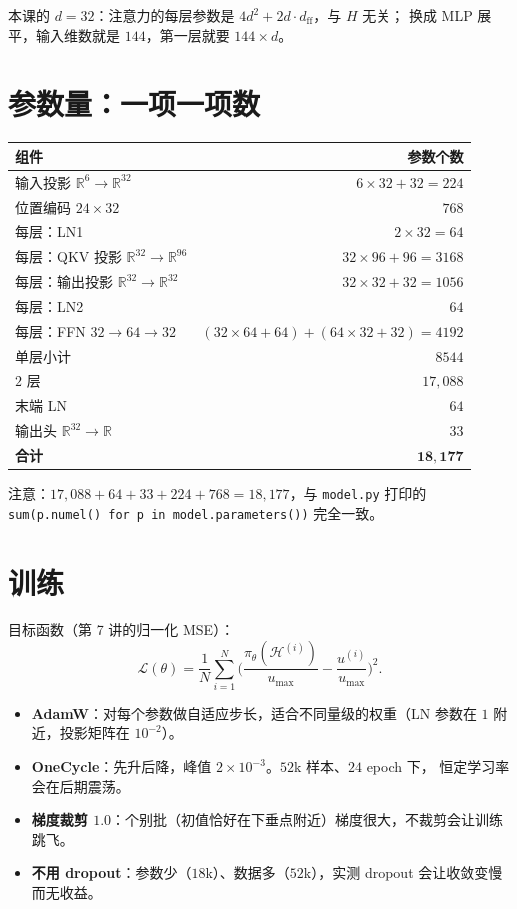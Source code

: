 本课的 $d=32$：注意力的每层参数是 $4d^2+2d\cdot d_{\text{ff}}$，与 $H$ 无关；
换成 MLP 展平，输入维数就是 $144$，第一层就要 $144\times d$。

\section{参数量：一项一项数}

\begin{center}
\small
\begin{tabular}{@{}lr@{}}
\toprule
组件 & 参数个数 \\
\midrule
输入投影 $\mathbb{R}^6\to\mathbb{R}^{32}$ & $6\times32+32=224$ \\
位置编码 $24\times32$ & $768$ \\
每层：LN1 & $2\times32=64$ \\
每层：QKV 投影 $\mathbb{R}^{32}\to\mathbb{R}^{96}$ & $32\times96+96=3168$ \\
每层：输出投影 $\mathbb{R}^{32}\to\mathbb{R}^{32}$ & $32\times32+32=1056$ \\
每层：LN2 & $64$ \\
每层：FFN $32\to64\to32$ & $(32\times64+64)+(64\times32+32)=4192$ \\
\midrule
单层小计 & $8544$ \\
$2$ 层 & $17{,}088$ \\
\midrule
末端 LN & $64$ \\
输出头 $\mathbb{R}^{32}\to\mathbb{R}$ & $33$ \\
\midrule
\textbf{合计} & $\mathbf{18{,}177}$ \\
\bottomrule
\end{tabular}
\end{center}

注意：$17{,}088+64+33+224+768=18{,}177$，与 \texttt{model.py} 打印的
\texttt{sum(p.numel() for p in model.parameters())} 完全一致。

\section{训练}

目标函数（第 7 讲的归一化 MSE）：
\begin{equation}
  \mathcal{L}(\theta)=\frac{1}{N}\sum_{i=1}^{N}
  \Big(\frac{\pi_\theta(\mathcal{H}^{(i)})}{u_{\max}}-\frac{u^{(i)}}{u_{\max}}\Big)^2 .
\end{equation}

\begin{itemize}[leftmargin=2em,itemsep=2pt]
  \item \textbf{AdamW}：对每个参数做自适应步长，适合不同量级的权重（LN 参数在 $1$ 附近，投影矩阵在 $10^{-2}$）。
  \item \textbf{OneCycle}：先升后降，峰值 $2\times10^{-3}$。$52$k 样本、$24$ epoch 下，
        恒定学习率会在后期震荡。
  \item \textbf{梯度裁剪 $1.0$}：个别批（初值恰好在下垂点附近）梯度很大，不裁剪会让训练跳飞。
  \item \textbf{不用 dropout}：参数少（$18$k）、数据多（$52$k），实测 dropout 会让收敛变慢而无收益。
\end{itemize}

